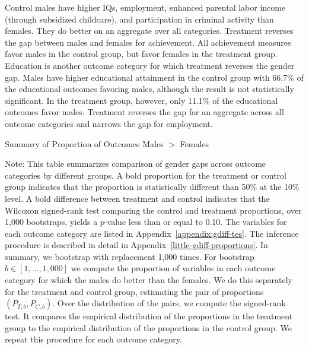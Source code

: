 Control males have higher IQs, employment, enhanced parental labor income (through subsidized childcare), and participation in criminal activity than females. They do better on an aggregate over all categories. Treatment reverses the gap between males and females for achievement. All achievement measures favor males in the control group, but favor females in the treatment group. Education is another outcome category for which treatment reverses the gender gap. Males have higher educational attainment in the control group with 66.7\% of the educational outcomes favoring males, although the result is not statistically significant. In the treatment group, however, only 11.1\% of the educational outcomes favor males. Treatment reverses the gap for an aggregate across all outcome categories and narrows the gap for employment.

\begin{table}[H]
\centering
\caption{Summary of Proportion of Outcomes Males $>$ Females}
\label{tab:proportion-table-ranksign}
\begin{threeparttable}

\begin{tablenotes}
\footnotesize
\item Note: This table summarizes comparison of gender gaps across outcome categories by different groups. A bold proportion for the treatment or control group indicates that the proportion is statistically different than 50\% at the 10\% level. A bold difference between treatment and control indicates that the Wilcoxon signed-rank test comparing the control and treatment proportions, over 1,000 bootstraps, yields a $p$-value less than or equal to 0.10. The variables for each outcome category are listed in Appendix~\ref{appendix:gdiff-tes}. The inference procedure is described in detail in Appendix~\ref{little-gdiff-proportions}. In summary, we bootstrap with replacement 1,000 times. For bootstrap $b \in [1, \ldots, 1,000]$ we compute the proportion of variables in each outcome category for which the males do better than the females. We do this separately for the treatment and control group, estimating the pair of proportions $(P_{T,b}, P_{C,b})$. Over the distribution of the pairs, we compute the signed-rank test. It compares the empirical distribution of the proportions in the treatment group to the empirical distribution of the proportions in the control group. We repeat this procedure for each outcome category.
\end{tablenotes}
\end{threeparttable}
\end{table}

